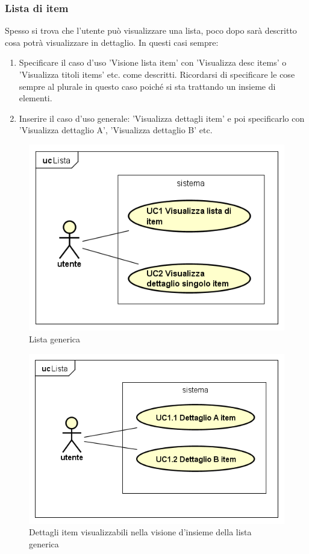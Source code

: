 \documentclass[a4paper,11pt]{article}
\begin{document}
			
	\newpage	
	\subsubsection{Lista di item} 
	Spesso si trova che l'utente può visualizzare una lista, poco dopo sarà descritto cosa potrà visualizzare in dettaglio. In questi casi sempre:
		\begin{enumerate}
			\item Specificare il caso d'uso 'Visione lista item' con 'Visualizza desc items' o 'Visualizza titoli items' etc. come descritti. Ricordarsi di specificare le cose sempre al plurale in questo caso poiché si sta trattando un insieme di elementi.
			\item Inserire il caso d'uso generale: 'Visualizza dettagli item' e poi specificarlo con 'Visualizza dettaglio A', 'Visualizza dettaglio B' etc.
		\end{enumerate}
	
		\begin{figure} [h]
			\centering
			\includegraphics[scale=0.50]{UseCasePattern/Lista/Lista}
			\caption{Lista generica}
		\end{figure}
		
		\begin{figure} [h]
			\centering
			\includegraphics[scale=0.50]{UseCasePattern/Lista/ListaDettagli}
			\caption{Dettagli item visualizzabili nella visione d'insieme della lista generica}
		\end{figure}
		
\end{document}
